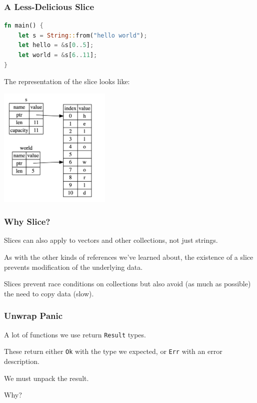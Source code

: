 \begin{frame}[fragile]
\frametitle{A Less-Delicious Slice}

\begin{lstlisting}[language=Rust]
fn main() {
    let s = String::from("hello world");
    let hello = &s[0..5];
    let world = &s[6..11];
}
\end{lstlisting}

The representation of the slice looks like:
\begin{center}
	\includegraphics[width=0.4\textwidth]{images/string-slice.png}
\end{center}

\end{frame}


\begin{frame}
\frametitle{Why Slice?}

Slices can also apply to vectors and other collections, not just strings. 

As with the other kinds of references we've learned about, the existence of a slice prevents modification of the underlying data. 

Slices prevent race conditions on collections but also avoid (as much as possible) the need to copy data (slow).

\end{frame}


\begin{frame}
\frametitle{Unwrap Panic}

A lot of functions we use return \texttt{Result} types.


These return either \texttt{Ok} with the type we expected, or \texttt{Err} with an error description.

We must unpack the result.

Why?

\end{frame}



